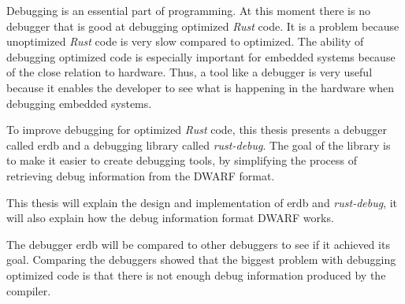 Debugging is an essential part of programming.
At this moment there is no debugger that is good at debugging optimized \emph{Rust} code.
It is a problem because unoptimized \emph{Rust} code is very slow compared to optimized.
The ability of debugging optimized code is especially important for embedded systems because of the close relation to hardware.
Thus, a tool like a debugger is very useful because it enables the developer to see what is happening in the hardware when debugging embedded systems.


To improve debugging for optimized \emph{Rust} code, this thesis presents a debugger called \acrshort{erdb} and a debugging library called \emph{rust-debug}.
The goal of the library is to make it easier to create debugging tools, by simplifying the process of retrieving debug information from the \acrshort{DWARF} format.


This thesis will explain the design and implementation of \acrshort{erdb} and \emph{rust-debug}, it will also explain how the debug information format \acrshort{DWARF} works.


The debugger \acrshort{erdb} will be compared to other debuggers to see if it achieved its goal.
Comparing the debuggers showed that the biggest problem with debugging optimized code is that there is not enough debug information produced by the compiler.

